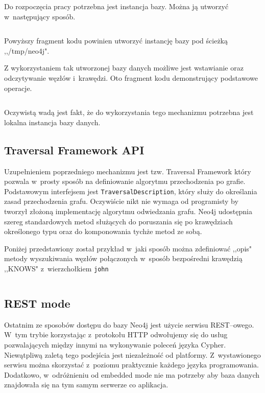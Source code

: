 \documentclass{xmgr}
\begin{document}
\medskip\noindent Do rozpoczęcia pracy potrzebna jest instancja bazy. Można ją utworzyć w~następujący sposób.

\inputminted{java}{listings/java/neo4j-core-api-dbcreate.java}

Powyższy fragment kodu powinien utworzyć instancję bazy pod ścieżką ,,/tmp/neo4j".

Z wykorzystaniem tak utworzonej bazy danych możliwe jest wstawianie oraz odczytywanie węzłów i~krawędzi. Oto fragment kodu demonstrujący podstawowe operacje.

\newpage

\inputminted{java}{listings/java/neo4j-core-api-use.java}

Oczywistą wadą jest fakt, że do wykorzystania tego mechanizmu potrzebna jest lokalna instancja bazy danych.

\subsection{Traversal Framework API}

Uzupełnieniem poprzedniego mechanizmu jest tzw. Traversal Framework który pozwala w~prosty sposób na definiowanie algorytmu przechodzenia po grafie. Podstawowym interfejsem jest \texttt{TraversalDescription}, który służy do określania zasad przechodzenia grafu. Oczywiście nikt nie wymaga od programisty by tworzył złożoną implementację algorytmu odwiedzania grafu. Neo4j udostępnia szereg standardowych metod służących do poruszania się po krawędziach określonego typu oraz do komponowania tychże metod ze sobą.

Poniżej przedstawiony został przykład w~jaki sposób można zdefiniować ,,opis" metody wyszukiwania węzłów połączonych w~sposób bezpośredni krawędzią ,,KNOWS" z~wierzchołkiem \texttt{john}

\inputminted{java}{listings/java/neo4j-traversal-api-knows.java}

\subsection{REST mode}

Ostatnim ze sposobów dostępu do bazy Neo4j jest użycie serwisu REST--owego. W~tym trybie korzystając z~protokołu HTTP odwołujemy się do usług pozwalających między innymi na wykonywanie poleceń języka Cypher. Niewątpliwą zaletą tego podejścia jest niezależność od platformy. Z~wystawionego serwisu można skorzystać z~poziomu praktycznie każdego języka programowania. Dodatkowo, w~odróżnieniu od embedded mode nie ma potrzeby aby baza danych znajdowała się na tym samym serwerze co aplikacja.
\end{document}

